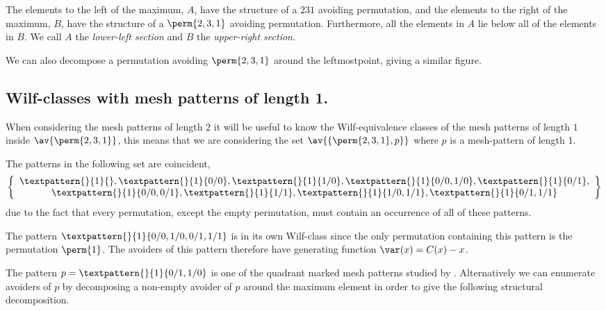 The elements to the left of the maximum, \(A\), have the structure of a \(231\)
avoiding permutation, and the elements to the right of the maximum, \(B\), have
the structure of a \(\perm{2,3,1}\) avoiding permutation. Furthermore, all the
elements in \(A\) lie below all of the elements in \(B\). We call \(A\) the
\emph{lower-left section} and \(B\) the \emph{upper-right section}.

We can also decompose a permutation avoiding \(\perm{2,3,1}\) around the
leftmostpoint, giving a similar figure.

\subsection{Wilf-classes with mesh patterns of length 1.}
When considering the mesh patterns of length \(2\) it will be useful to know
the Wilf-equivalence classes of the mesh patterns of length \(1\) inside
\(\av{\perm{2,3,1}}\), this means that we are considering the set
\(\av{\{\perm{2,3,1},p}\}\)
where \(p\) is a mesh-pattern of length 1.

The patterns in the following set are coincident,
\begin{equation*}
    \left\{
        \begin{array}{c}
        \textpattern{}{1}{},
        \textpattern{}{1}{0/0},
        \textpattern{}{1}{1/0},
        \textpattern{}{1}{0/0,1/0},
        \textpattern{}{1}{0/1},\\
        \textpattern{}{1}{0/0,0/1},
        \textpattern{}{1}{1/1},
        \textpattern{}{1}{1/0,1/1},
        \textpattern{}{1}{0/1,1/1}
    \end{array}
    \right\}
\end{equation*}
due to the fact that every permutation, except the empty
permutation, must contain an occurrence of all of these patterns.

The pattern \(\textpattern{}{1}{0/0,1/0,0/1,1/1}\) is in its own
Wilf-class since the only permutation containing this pattern is
the permutation \(\perm{1}\). The avoiders of this pattern therefore
have generating function \(\var(x) = C(x)-x\).

\nextvar
The pattern \(p = \textpattern{}{1}{0/1,1/0}\) is one of the
quadrant marked mesh patterns studied by \textcite{2012arXiv1201.6243K}.
Alternatively we can enumerate
avoiders of \(p\) by decomposing a non-empty avoider of \(p\) around the
maximum element
in order to give the following structural decomposition.

